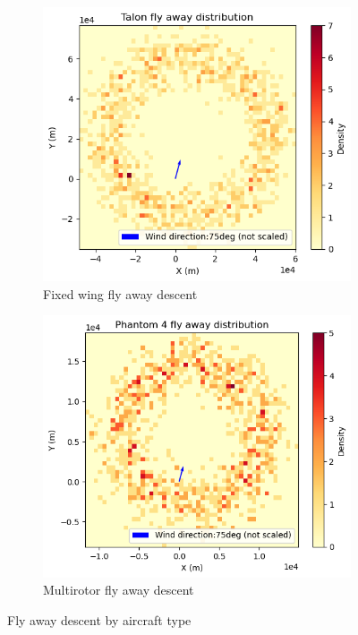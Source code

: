 \documentclass[12pt]{report}
\begin{document}
        \begin{figure}[H]
            \centering
            \begin{subfigure}[b]{0.45\textwidth}
                \centering
                \includegraphics[width=\textwidth]{Plot/talon/fly_away.png}
                \caption{Fixed wing fly away descent}
                \label{fig:fixed_wing}
            \end{subfigure}
            \hfill
            \begin{subfigure}[b]{0.45\textwidth}
                \centering
                \includegraphics[width=\textwidth]{Plot/phantom4/fly_away.png}
                \caption{Multirotor fly away descent}
                \label{fig:multirotor}
            \end{subfigure}
            \caption{Fly away descent by aircraft type}
            \label{fig:ballistic_descent}
        \end{figure}
\end{document}
